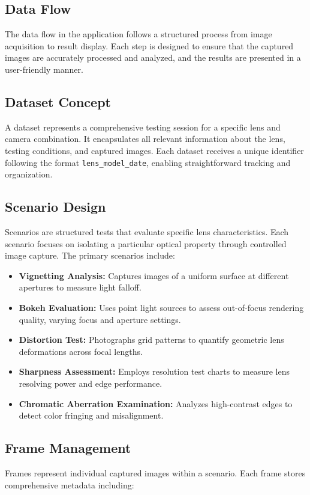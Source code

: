 \subsection{Data Flow}
The data flow in the application follows a structured process from image acquisition to result display. Each step is designed to ensure that the captured images are accurately processed and analyzed, and the results are presented in a user-friendly manner.

\subsection{Dataset Concept}
A dataset represents a comprehensive testing session for a specific lens and camera combination. It encapsulates all relevant information about the lens, testing conditions, and captured images. Each dataset receives a unique identifier following the format \texttt{lens\_model\_date}, enabling straightforward tracking and organization.

\subsection{Scenario Design}
Scenarios are structured tests that evaluate specific lens characteristics. Each scenario focuses on isolating a particular optical property through controlled image capture. The primary scenarios include:

\begin{itemize}
    \item \textbf{Vignetting Analysis:} Captures images of a uniform surface at different apertures to measure light falloff.
    \item \textbf{Bokeh Evaluation:} Uses point light sources to assess out-of-focus rendering quality, varying focus and aperture settings.
    \item \textbf{Distortion Test:} Photographs grid patterns to quantify geometric lens deformations across focal lengths.
    \item \textbf{Sharpness Assessment:} Employs resolution test charts to measure lens resolving power and edge performance.
    \item \textbf{Chromatic Aberration Examination:} Analyzes high-contrast edges to detect color fringing and misalignment.
\end{itemize}

\subsection{Frame Management}
Frames represent individual captured images within a scenario. Each frame stores comprehensive metadata including:

